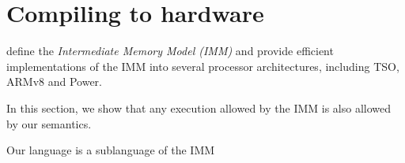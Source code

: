 \section{Compiling to hardware}

\citet{DBLP:journals/pacmpl/PodkopaevLV19} define the \emph{Intermediate
  Memory Model (IMM)} and provide efficient implementations of the IMM into
several processor architectures, including TSO, ARMv8 and Power.

In this section, we show that any execution allowed by the IMM is also
allowed by our semantics.

Our language is a sublanguage of the IMM
